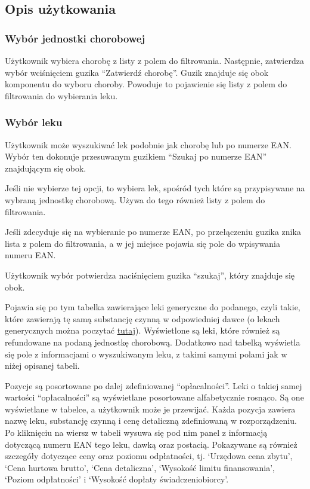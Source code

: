 \documentclass{article}
\begin{document}
    \subsection{Opis użytkowania}
      \subsubsection{Wybór jednostki chorobowej}
      Użytkownik wybiera chorobę z listy z polem do filtrowania.
      Następnie, zatwierdza wybór wciśnięciem guzika ``Zatwierdź chorobę''.
      Guzik znajduje się obok komponentu do wyboru choroby.
      Powoduje to pojawienie się listy z polem do filtrowania do wybierania leku.

      \subsubsection{Wybór leku}
      Użytkownik może wyszukiwać lek podobnie jak chorobę lub po numerze EAN.
      Wybór ten dokonuje przesuwanym guzikiem ``Szukaj po numerze EAN'' znajdującym się obok.

      Jeśli nie wybierze tej opcji, to wybiera lek, spośród tych które są przypisywane na wybraną jednostkę chorobową.
      Używa do tego również listy z polem do filtrowania.

      Jeśli zdecyduje się na wybieranie po numerze EAN, po przełączeniu guzika znika lista z polem do filtrowania,
      a w jej miejsce pojawia się pole do wpisywania numeru EAN.

      Użytkownik wybór potwierdza naciśnięciem guzika ``szukaj'', który znajduje się obok.

      Pojawia się po tym tabelka zawierające leki generyczne do podanego, czyli takie, które zawierają tę samą substancję czynną w odpowiedniej dawce
      (o lekach generycznych można poczytać \href{https://pl.wikipedia.org/wiki/Lek_generyczny}{tutaj}).
      Wyświetlone są leki, które również są refundowane na podaną jednostkę chorobową.
      Dodatkowo nad tabelką wyświetla się pole z informacjami o wyszukiwanym leku, z takimi samymi polami jak w niżej opisanej tabeli.

      Pozycje są posortowane po dalej zdefiniowanej ``opłacalności''.
      Leki o takiej samej wartości ``opłacalności'' są wyświetlane posortowane alfabetycznie rosnąco.
      Są one wyświetlane w tabelce, a użytkownik może je przewijać.
      Każda pozycja zawiera nazwę leku, substancję czynną i cenę detaliczną zdefiniowaną w rozporządzeniu.
      Po kliknięciu na wiersz w tabeli wysuwa się pod nim panel z informacją dotyczącą numeru EAN tego leku, dawką oraz postacią.
      Pokazywane są również szczegóły dotyczące ceny oraz poziomu odpłatności, tj.
      `Urzędowa cena zbytu',
      `Cena hurtowa brutto',
      `Cena detaliczna',
      `Wysokość limitu finansowania',
      `Poziom odpłatności' i
      `Wysokość dopłaty świadczeniobiorcy'.
\end{document}
